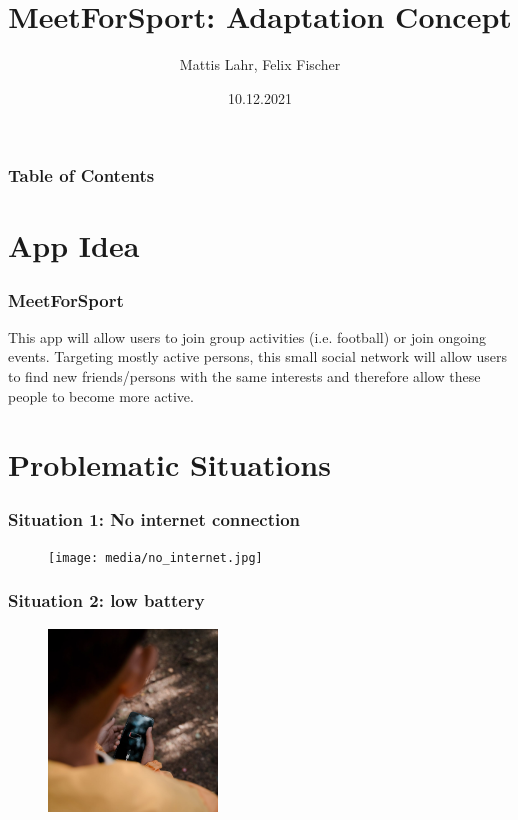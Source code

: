 \documentclass[aspectratio=169]{beamer}
\title{MeetForSport: Adaptation Concept}
\author{Mattis Lahr, Felix Fischer}
\date{10.12.2021}
\begin{document}
\maketitle



\begin{frame}
    \frametitle{Table of Contents}
    \tableofcontents
\end{frame}



\section{App Idea}
\begin{frame}
\frametitle{MeetForSport}
This app will allow users to join group activities (i.e. football) or join ongoing events.
Targeting mostly active persons, this small social network will allow users  to find new friends/persons with the same interests and therefore allow these people to become more active.
\end{frame}

\section{Problematic Situations}
\begin{frame}   
	\frametitle{Situation 1:  No internet connection}
	 \begin{figure}
		\centering
		\texttt{[image: media/no\_internet.jpg]}
	\end{figure}
\end{frame}
\begin{frame}   
	\frametitle{Situation 2: low battery}
	 \begin{figure}
		\centering
		\includegraphics[width=0.4\textwidth]{media/low_battery.jpg}
	\end{figure}
\end{frame}
\end{document}
